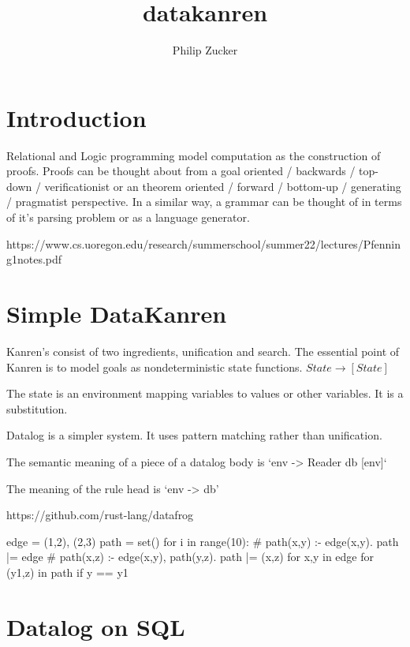 

\title{datakanren}


\author{Philip Zucker}



\section{Introduction}

Relational and Logic programming model computation as the construction of proofs.
Proofs can be thought about from a goal oriented / backwards / top-down / verificationist or an theorem oriented / forward / bottom-up / generating / pragmatist perspective.
In a similar way, a grammar can be thought of in terms of it's parsing problem or as a language generator.

https://www.cs.uoregon.edu/research/summerschool/summer22/lectures/Pfenning1notes.pdf


\section{Simple DataKanren}

Kanren's consist of two ingredients, unification and search.
The essential point of Kanren is to model goals as nondeterministic state functions.
$ State \rightarrow [State] $

The state is an environment mapping variables to values or other variables. It is a substitution.

Datalog is a simpler system. It uses pattern matching rather than unification.

The semantic meaning of a piece of a datalog body is `env -> Reader db [env]`

The meaning of the rule head is `env -> db'


\cite{datafrog} https://github.com/rust-lang/datafrog


   edge = {(1,2), (2,3)}
   path = set()
   for i in range(10):
       # path(x,y) :- edge(x,y).
       path |= edge
       # path(x,z) :- edge(x,y), path(y,z).
       path |= {(x,z) for x,y in edge for (y1,z) in path if y == y1}




\section{Datalog on SQL}

